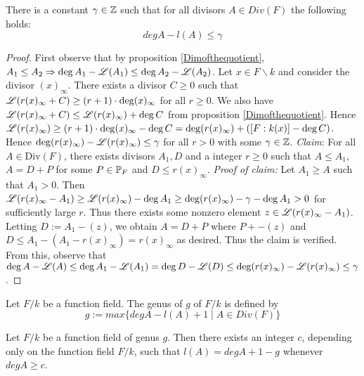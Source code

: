 \begin{proposition}
	There is a constant $\gamma \in \mathbb{Z} $ such that for all 
	divisors $A \in Div(F)$ the following holds:
	$$ degA - l(A) \leq \gamma $$
\end{proposition}

\begin{proof}
	First observe that by proposition \ref{Dimofthequotient}, 
	$A_1 \leq A_2  \Rightarrow \deg A_1 - \mathscr{L}(A_1) \leq \deg A_2 - \mathscr{L}(A_2)$.
	Let $x \in F \backslash k$ and consider the divisor $(x)_\infty$. 
	There exists a divisor $C \geq 0 $ such that
	$\mathscr{L} (r(x)_\infty + C ) \geq (r + 1) \cdot \deg (x)_\infty$ for all 
	$r \geq 0$. We also have $\mathscr{L} (r(x)_\infty + C) \leq \mathscr{L}(r(x)_\infty) + \deg C$
	from proposition \ref{Dimofthequotient}. 
	Hence $\mathscr{L}(r(x)_\infty) \geq (r+1) \cdot \deg (x)_\infty 
	- \deg C = \deg (r(x)_\infty ) + ([F : k(x)] - \deg C) $. 
	Hence $\deg (r(x)_\infty ) - \mathscr{L} (r(x)_\infty ) \leq \gamma$ for all $r > 0$
	with some $\gamma \in \mathbb{Z}$. 
	\textit{Claim}: For all $A \in \text{Div}(F)$, there exists divisors 
	$A_1,D$ and a integer $r \geq 0$ such that $A \leq A_1$, $A = D + P$ 
	for some $P \in \mathbb{P}_F$ and $D \leq r(x)_\infty$. \textit{Proof of claim:}
	Let $A_1 \geq A $ such that $A_1 > 0 $. 
	Then $\mathscr{L} (r (x)_\infty - A_1) \geq \mathscr{L} (r(x)_\infty ) - 
	\deg A_1 \geq \deg (r(x)_\infty ) - \gamma - \deg A_1 > 0 $
	for sufficiently large $r$. Thus there exists some nonzero element 
	$z \in \mathscr{L} ( r(x)_\infty - A_1)$. Letting $D:= A_1 - (z)$, we 
	obtain $A = D + P $ where $P + -(z)$ and
	$D \leq A_1 - (A_1 - r(x)_\infty ) = r(x)_\infty$ as desired.
	Thus the claim is verified. 
	From this, observe that
	$\deg A - \mathscr{L} (A) \leq \deg A_1 - \mathscr{L} (A_1) = \deg D 
	- \mathscr{L} (D) \leq \deg(r(x)_\infty ) - \mathscr{L} (r(x)_\infty ) \leq \gamma $.
\end{proof}



\begin{definition}
	Let $F/k $ be a function field.
	The genus of $g$ of $F/k$ is defined 
	by $$ g := max \lbrace degA - l(A) + 1 \mid A \in Div(F) \rbrace $$
\end{definition}


\begin{theorem} \label{Riemannstheorem}
	Let $F/k$ be a function field of genus $g$. 
	Then there exists an integer $c$, depending only on the
	function field $F/k$, such that $l(A) = degA + 1 - g $ whenever $degA \geq c$.
\end{theorem}


